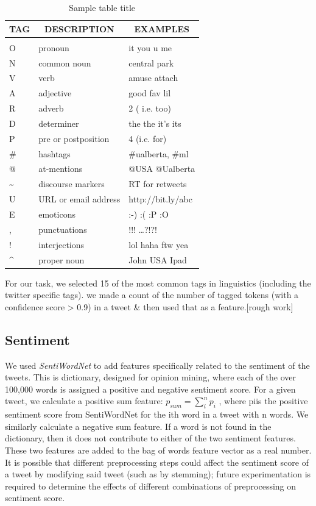 \begin{table}[t]
\caption{Sample table title}
\label{sample-table}
\begin{center}
\begin{tabular}{lll}
\multicolumn{1}{c}{\bf TAG}  &\multicolumn{1}{c}{\bf DESCRIPTION} &\multicolumn{1}{c}{\bf EXAMPLES}
\\ \hline \\
O & pronoun & it you u me \\
N & common noun & central park\\
V & verb & amuse attach\\
A & adjective & good fav lil\\
R & adverb & 2 ( i.e. too)\\
D & determiner & the the it's its\\
P & pre or postposition & 4 (i.e. for)\\
\# & hashtags & \#ualberta, \#ml\\
@ & at-mentions & @USA @Ualberta\\
\textasciitilde & discourse markers & RT for retweets\\
U & URL or email address & http://bit.ly/abc\\
E & emoticons & :-) :( :P :O\\
, & punctuations & !!! \dots ?!?!\\
! & interjections & lol haha ftw yea\\
\textasciicircum & proper noun & John USA Ipad\\
\end{tabular}
\end{center}
\end{table}

For our task, we selected 15 of the most common tags in linguistics (including the twitter specific tags). we made a count of the number of tagged tokens (with a confidence score > 0.9) in a tweet \& then used that as a feature.[rough work]


\subsection{Sentiment} %
\label{sub:sentiment}

We used \textit{SentiWordNet} to add features specifically related to the sentiment of the tweets. This is dictionary, designed for opinion mining, where each of the over 100,000 words is assigned a positive and negative sentiment score. For a given tweet, we calculate a positive sum feature: $p_{sum} = \sum_{i}^n p_i$ , where piis the positive sentiment score from SentiWordNet for the ith word in a tweet with n words. We similarly calculate a negative sum feature. If a word is not found in the dictionary, then it does not contribute to either of the two sentiment features. These two features are added to the bag of words feature vector as a real number. It is possible that different preprocessing steps could affect the sentiment score of a tweet by modifying said tweet (such as by stemming); future experimentation is required to determine the effects of different combinations of preprocessing on sentiment score.

